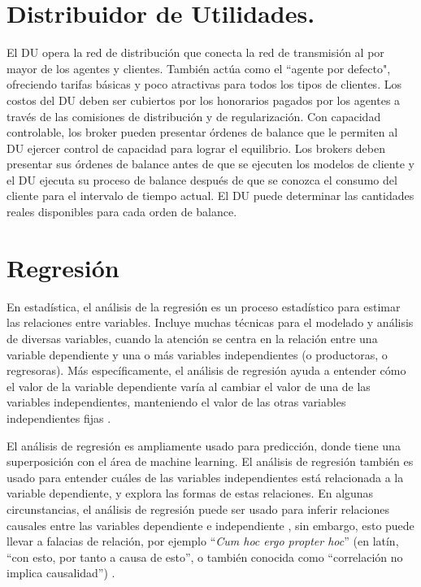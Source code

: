 \section{Distribuidor de Utilidades.}
El DU opera la red de distribución que conecta la red de transmisión al por mayor de los agentes y clientes. También actúa como el “agente por defecto", ofreciendo tarifas básicas y poco atractivas para todos los tipos de clientes. 
Los  costos del DU deben ser cubiertos por los honorarios pagados por los agentes a través de las comisiones de distribución y de regularización. 
Con capacidad controlable, los broker pueden presentar órdenes de balance que le permiten al DU ejercer control de capacidad para lograr el equilibrio. 
Los brokers deben presentar sus órdenes de balance antes de que se ejecuten los modelos de cliente y el DU ejecuta su proceso de balance después de que se conozca el consumo del cliente para el intervalo de tiempo actual. 
El DU puede determinar las cantidades reales disponibles para cada orden de balance.
\\
\section{Regresión}
En estadística, el análisis de la regresión es un proceso estadístico para estimar las relaciones entre variables. Incluye muchas técnicas para el modelado y análisis de diversas variables, cuando la atención se centra en la relación entre una variable
dependiente y una o más variables independientes (o productoras, o regresoras).
Más específicamente, el análisis de regresión ayuda a entender cómo el valor de la variable dependiente varía al cambiar el valor de una de las variables independientes, manteniendo el valor de las otras variables independientes fijas \cite{BoundlessRegressionAnalysis}.

El análisis de regresión es ampliamente usado para predicción, donde tiene una superposición con el área de machine learning. 
El análisis de regresión también es usado para entender cuáles de las variables independientes está relacionada a la variable dependiente, y explora las formas de estas relaciones. 
En algunas circunstancias, el análisis de regresión puede ser usado para inferir relaciones causales entre las variables dependiente e independiente \cite{BoundlessRegressionAnalysis}, sin embargo, esto puede llevar a falacias de relación, por ejemplo ``\textit{Cum hoc ergo propter hoc}'' (en latín, ``con esto, por tanto a causa de esto'', o también conocida como ``correlación no implica causalidad'') \cite{JSArmstrongIllusions}.

